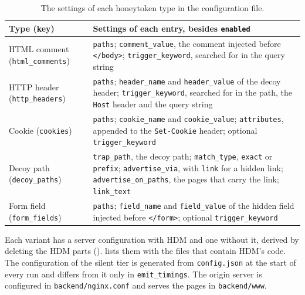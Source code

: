 \documentclass{rptuma}
\begin{document}
\begin{table}[!htbp]
\centering
\small
\begin{tabularx}{\textwidth}{@{}>{\raggedright\arraybackslash}p{3.1cm}X@{}}
\toprule
Type (key) & Settings of each entry, besides \texttt{enabled} \\
\midrule
HTML comment (\texttt{html\_comments}) & \texttt{paths}; \texttt{comment\_value}, the comment injected before \texttt{</body>}; \texttt{trigger\_keyword}, searched for in the query string \\ \addlinespace
HTTP header (\texttt{http\_headers}) & \texttt{paths}; \texttt{header\_name} and \texttt{header\_value} of the decoy header; \texttt{trigger\_keyword}, searched for in the path, the \texttt{Host} header and the query string \\ \addlinespace
Cookie (\texttt{cookies}) & \texttt{paths}; \texttt{cookie\_name} and \texttt{cookie\_value}; \texttt{attributes}, appended to the \texttt{Set-Cookie} header; optional \texttt{trigger\_keyword} \\ \addlinespace
Decoy path (\texttt{decoy\_paths}) & \texttt{trap\_path}, the decoy path; \texttt{match\_type}, \texttt{exact} or \texttt{prefix}; \texttt{advertise\_via}, with \texttt{link} for a hidden link; \texttt{advertise\_on\_paths}, the pages that carry the link; \texttt{link\_text} \\ \addlinespace
Form field (\texttt{form\_fields}) & \texttt{paths}; \texttt{field\_name} and \texttt{field\_value} of the hidden field injected before \texttt{</form>}; optional \texttt{trigger\_keyword} \\
\bottomrule
\end{tabularx}
\caption{The settings of each honeytoken type in the configuration file.}
\label{tab:app.config.tokens}
\end{table}

Each variant has a server configuration with HDM and one without it, derived by deleting the HDM
parts ().  lists them with the files that
contain HDM's code. The configuration of the silent tier is generated from \texttt{config.json} at
the start of every run and differs from it only in \texttt{emit\_timings}. The origin server is
configured in \texttt{backend/nginx.conf} and serves the pages in \texttt{backend/www}.
\end{document}

